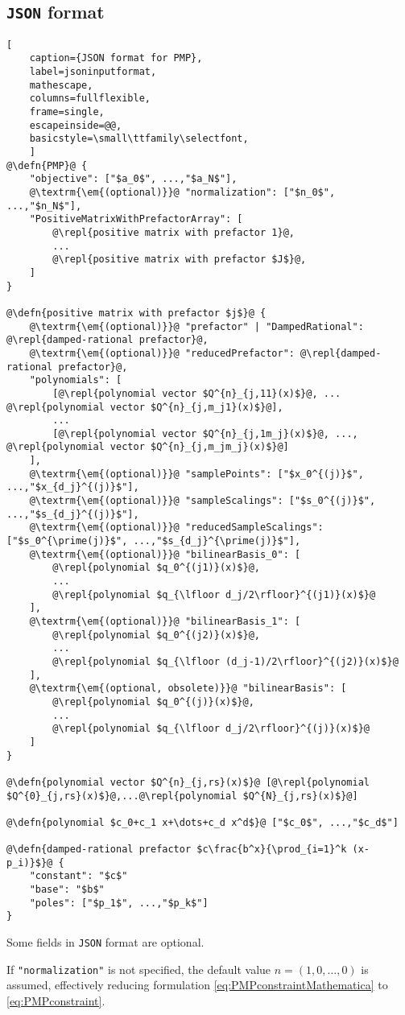 \documentclass[12pt]{article}
\numberwithin{equation}{section}
\newcommand\repl[1]{$\langle$\textrm{\em #1}$\rangle$}
\newcommand\defn[1]{\textrm{\em #1}\ $\equiv$}
\begin{document}
\subsection{\texttt{JSON} format}
\begin{lstlisting}[
	caption={JSON format for PMP},
	label=jsoninputformat,
	mathescape,
	columns=fullflexible,
	frame=single,
	escapeinside=@@,
	basicstyle=\small\ttfamily\selectfont,
	]
@\defn{PMP}@ {
	"objective": ["$a_0$", ...,"$a_N$"],
	@\textrm{\em{(optional)}}@ "normalization": ["$n_0$", ...,"$n_N$"],
	"PositiveMatrixWithPrefactorArray": [
		@\repl{positive matrix with prefactor 1}@,
		...
		@\repl{positive matrix with prefactor $J$}@,
	]
}

@\defn{positive matrix with prefactor $j$}@ {
	@\textrm{\em{(optional)}}@ "prefactor" | "DampedRational": @\repl{damped-rational prefactor}@,
	@\textrm{\em{(optional)}}@ "reducedPrefactor": @\repl{damped-rational prefactor}@,
	"polynomials": [
		[@\repl{polynomial vector $Q^{n}_{j,11}(x)$}@, ... @\repl{polynomial vector $Q^{n}_{j,m_j1}(x)$}@],
		...
		[@\repl{polynomial vector $Q^{n}_{j,1m_j}(x)$}@, ..., @\repl{polynomial vector $Q^{n}_{j,m_jm_j}(x)$}@]
	],
	@\textrm{\em{(optional)}}@ "samplePoints": ["$x_0^{(j)}$", ...,"$x_{d_j}^{(j)}$"],
	@\textrm{\em{(optional)}}@ "sampleScalings": ["$s_0^{(j)}$", ...,"$s_{d_j}^{(j)}$"],
	@\textrm{\em{(optional)}}@ "reducedSampleScalings": ["$s_0^{\prime(j)}$", ...,"$s_{d_j}^{\prime(j)}$"],
	@\textrm{\em{(optional)}}@ "bilinearBasis_0": [
		@\repl{polynomial $q_0^{(j1)}(x)$}@,
		...
		@\repl{polynomial $q_{\lfloor d_j/2\rfloor}^{(j1)}(x)$}@
	],
	@\textrm{\em{(optional)}}@ "bilinearBasis_1": [
		@\repl{polynomial $q_0^{(j2)}(x)$}@,
		...
		@\repl{polynomial $q_{\lfloor (d_j-1)/2\rfloor}^{(j2)}(x)$}@
	],
	@\textrm{\em{(optional, obsolete)}}@ "bilinearBasis": [
		@\repl{polynomial $q_0^{(j)}(x)$}@,
		...
		@\repl{polynomial $q_{\lfloor d_j/2\rfloor}^{(j)}(x)$}@
	]
}
	
@\defn{polynomial vector $Q^{n}_{j,rs}(x)$}@ [@\repl{polynomial $Q^{0}_{j,rs}(x)$}@,...@\repl{polynomial $Q^{N}_{j,rs}(x)$}@]

@\defn{polynomial $c_0+c_1 x+\dots+c_d x^d$}@ ["$c_0$", ...,"$c_d$"]

@\defn{damped-rational prefactor $c\frac{b^x}{\prod_{i=1}^k (x-p_i)}$}@ {
	"constant": "$c$"
	"base": "$b$"
	"poles": ["$p_1$", ...,"$p_k$"]
}
\end{lstlisting}

Some fields in \texttt{JSON} format are optional.

If \texttt{"normalization"} is not specified, the default value $n=(1,0,\ldots,0)$ is assumed, effectively reducing formulation \eqref{eq:PMPconstraintMathematica} to \eqref{eq:PMPconstraint}.
\end{document}
